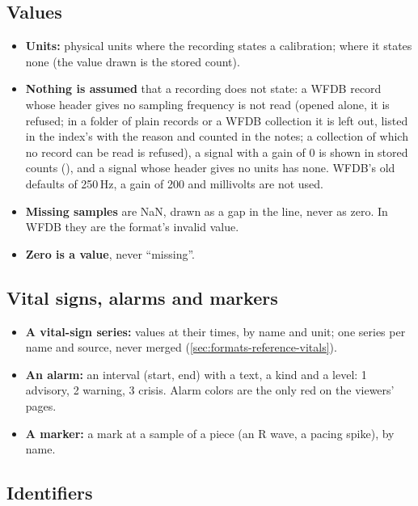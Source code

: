 \subsection{Values}
\label{sec:formats-reference-values}

\begin{itemize}
\item \textbf{Units:} physical units where the recording states a calibration;  where it
  states none (the value drawn is the stored count).
\item \textbf{Nothing is assumed} that a recording does not state: a WFDB record whose header
  gives no sampling frequency is not read (opened alone, it is refused; in a folder of plain
  records or a WFDB collection it is left out, listed in the index's  with the
  reason and counted in the notes; a collection of which no record can be read is refused), a
  signal with a gain of 0 is shown in
  stored counts (), and a signal whose header gives no units has none. WFDB's old
  defaults of 250\,Hz, a gain of 200 and millivolts are not used.
\item \textbf{Missing samples} are NaN, drawn as a gap in the line, never as zero. In WFDB they
  are the format's invalid value.
\item \textbf{Zero is a value}, never ``missing''.
\end{itemize}

\subsection{Vital signs, alarms and markers}
\label{sec:formats-reference-events}

\begin{itemize}
\item \textbf{A vital-sign series:} values at their times, by name and unit; one series per name
  and source, never merged (\cref{sec:formats-reference-vitals}).
\item \textbf{An alarm:} an interval (start, end) with a text, a kind and a level: 1 advisory,
  2 warning, 3 crisis. Alarm colors are the only red on the viewers' pages.
\item \textbf{A marker:} a mark at a sample of a piece (an R wave, a pacing spike), by name.
\end{itemize}

\subsection{Identifiers}
\label{sec:formats-reference-identifiers}

